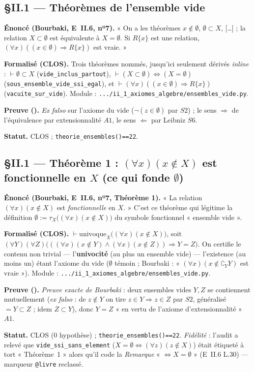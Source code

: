 \subsection{§II.1 --- Théorèmes de l'ensemble vide}
\textbf{Énoncé (Bourbaki, E~II.6, nº7).} « On a les théorèmes $x\notin\emptyset$,
$\emptyset\subset X$, [\dots] ; la relation $X\subset\emptyset$ est équivalente à
$X=\emptyset$. Si $R\{x\}$ est une relation, $(\forall x)((x\in\emptyset)\Rightarrow R\{x\})$
est vraie. »

\textbf{Formalisé (CLOS).} Trois théorèmes nommés, jusqu'ici seulement dérivés \emph{inline} :
$\vdash\emptyset\subset X$ (\texttt{vide\_inclus\_partout}), $\vdash(X\subset\emptyset)
\Leftrightarrow(X=\emptyset)$ (\texttt{sous\_ensemble\_vide\_ssi\_egal}), et
$\vdash(\forall x)((x\in\emptyset)\Rightarrow R\{x\})$ (\texttt{vacuite\_sur\_vide}). Module :
\texttt{.../ii\_1\_axiomes\_algebre/ensembles\_vide.py}.

\textbf{Preuve (\Nstar).} \emph{Ex falso} sur l'axiome du vide ($\neg(z\in\emptyset)$ par $S2$) ;
le sens $\Rightarrow$ de l'équivalence par extensionnalité $A1$, le sens $\Leftarrow$ par Leibniz $S6$.

\textbf{Statut.} CLOS ; \texttt{theorie\_ensembles()==22}.

\subsection{§II.1 --- Théorème 1 : $(\forall x)(x\notin X)$ est fonctionnelle en $X$ (ce qui fonde $\emptyset$)}
\textbf{Énoncé (Bourbaki, E~II.6, nº7, Théorème 1).} « La relation $(\forall x)(x\notin X)$ est
\emph{fonctionnelle} en $X$. » C'est ce théorème qui légitime la définition
$\emptyset:=\tau_X\bigl((\forall x)(x\notin X)\bigr)$ du symbole fonctionnel « ensemble vide ».

\textbf{Formalisé (CLOS).} $\vdash\mathrm{univoque}_X\bigl((\forall x)(x\notin X)\bigr)$, soit
$(\forall Y)(\forall Z)\bigl(((\forall x)(x\notin Y)\wedge(\forall x)(x\notin Z))\Rightarrow Y=Z\bigr)$.
On certifie le contenu non trivial --- l'\textbf{univocité} (au plus un ensemble vide) --- l'existence
(au moins un) étant l'axiome du vide ($\emptyset$ témoin ; Bourbaki : « $(\forall x)(x\notin\complement_Y Y)$
est vraie »). Module : \texttt{.../ii\_1\_axiomes\_algebre/ensembles\_vide.py}.

\textbf{Preuve (\Nstar).} \emph{Preuve exacte de Bourbaki} : deux ensembles vides $Y,Z$ se contiennent
mutuellement (\emph{ex falso} : de $z\notin Y$ on tire $z\in Y\Rightarrow z\in Z$ par $S2$, généralisé
$=Y\subset Z$ ; idem $Z\subset Y$), donc $Y=Z$ « en vertu de l'axiome d'extensionnalité » $A1$.

\textbf{Statut.} CLOS ($0$ hypothèse) ; \texttt{theorie\_ensembles()==22}. \emph{Fidélité} : l'audit a
relevé que \texttt{vide\_ssi\_sans\_element} ($X{=}\emptyset\Leftrightarrow(\forall z)(z\notin X)$) était
étiqueté à tort « Théorème~1 » alors qu'il code la \emph{Remarque} « $\Leftrightarrow X=\emptyset$ »
(E~II.6 L.30) --- marqueur \texttt{@livre} reclassé.
